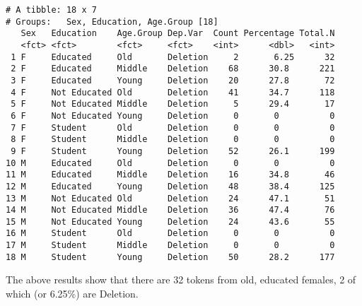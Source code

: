 \documentclass[
  12pt,
  letterpaper]{article}
\renewcommand\texttt[1]{{\ttfamily\color{BrickRed}#1}}
\begin{document}
\begin{verbatim}
# A tibble: 18 x 7
# Groups:   Sex, Education, Age.Group [18]
   Sex   Education    Age.Group Dep.Var  Count Percentage Total.N
   <fct> <fct>        <fct>     <fct>    <int>      <dbl>   <int>
 1 F     Educated     Old       Deletion     2       6.25      32
 2 F     Educated     Middle    Deletion    68      30.8      221
 3 F     Educated     Young     Deletion    20      27.8       72
 4 F     Not Educated Old       Deletion    41      34.7      118
 5 F     Not Educated Middle    Deletion     5      29.4       17
 6 F     Not Educated Young     Deletion     0       0          0
 7 F     Student      Old       Deletion     0       0          0
 8 F     Student      Middle    Deletion     0       0          0
 9 F     Student      Young     Deletion    52      26.1      199
10 M     Educated     Old       Deletion     0       0          0
11 M     Educated     Middle    Deletion    16      34.8       46
12 M     Educated     Young     Deletion    48      38.4      125
13 M     Not Educated Old       Deletion    24      47.1       51
14 M     Not Educated Middle    Deletion    36      47.4       76
15 M     Not Educated Young     Deletion    24      43.6       55
16 M     Student      Old       Deletion     0       0          0
17 M     Student      Middle    Deletion     0       0          0
18 M     Student      Young     Deletion    50      28.2      177
\end{verbatim}

The above results show that there are 32 tokens from old, educated
females, 2 of which (or 6.25\%) are \texttt{Deletion}.
\end{document}
